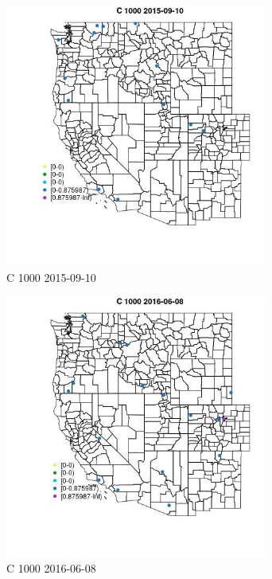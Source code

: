 \begin{figure} 
\centering  
\includegraphics[width=0.77\textwidth]{Code_Outputs/Report_ML_input_PM25_Step4_part_e_de_duplicated_aves_MapObsC_10002015-09-10.jpg} 
\caption{\label{fig:Report_ML_input_PM25_Step4_part_e_de_duplicated_avesMapObsC_10002015-09-10}C 1000 2015-09-10} 
\end{figure} 
 

\begin{figure} 
\centering  
\includegraphics[width=0.77\textwidth]{Code_Outputs/Report_ML_input_PM25_Step4_part_e_de_duplicated_aves_MapObsC_10002016-06-08.jpg} 
\caption{\label{fig:Report_ML_input_PM25_Step4_part_e_de_duplicated_avesMapObsC_10002016-06-08}C 1000 2016-06-08} 
\end{figure} 
 

